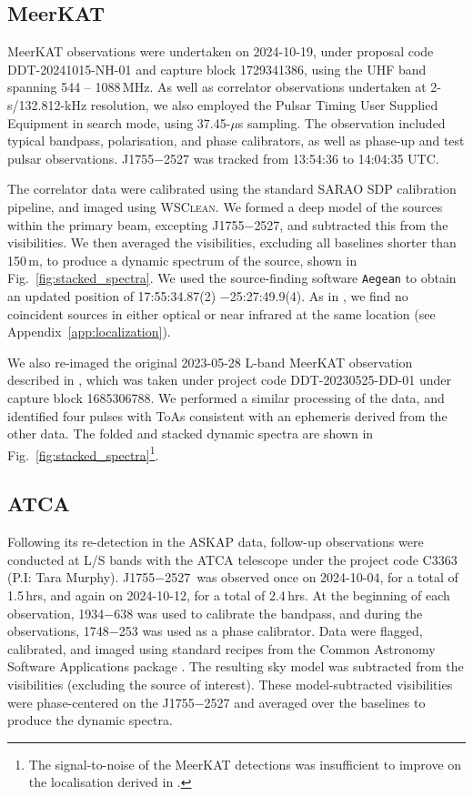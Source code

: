 \documentclass[fleqn,usenatbib]{mnras}
\newcommand{\revision}[2]{{\color{red}#2}}
\newcommand{\src}{J1755$-$2527}
\newcommand{\Fig}{Fig.}
\begin{document}
\subsection{MeerKAT} \label{sec:meerkat}

MeerKAT observations were undertaken on 2024-10-19, under proposal code DDT-20241015-NH-01 and capture block 1729341386, using the UHF band spanning 544 -- 1088\,MHz.
As well as correlator observations undertaken at 2-s/132.812-kHz resolution, we also employed the Pulsar Timing User Supplied Equipment \citep[PTUSE;][]{2020PASA...37...28B} in search mode, using 37.45-$\mu$s sampling. The observation included typical bandpass, polarisation, and phase calibrators, as well as phase-up and test pulsar observations. \src{} was tracked from 13:54:36 to 14:04:35 UTC.

The correlator data were calibrated using the standard SARAO SDP calibration pipeline, and imaged using \textsc{WSClean}. We formed a deep model of the sources within the primary beam, excepting \src{}, and subtracted this from the visibilities.
We then averaged the visibilities, excluding all baselines shorter than 150\,m, to produce a dynamic spectrum of the source, shown in \Fig~\ref{fig:stacked_spectra}.
\revision{}{We used the source-finding software \texttt{Aegean} \citep{2018PASA...35...11H} to obtain an updated position of 17:55:34.87(2) $-$25:27:49.9(4).
As in \citetalias{2024MNRAS.535..909D}, we find no coincident sources in either optical or near infrared at the same location (see Appendix~\ref{app:localization}).}

We also re-imaged the original 2023-05-28 L-band MeerKAT observation described in , which was taken under project code DDT-20230525-DD-01 under capture block 1685306788. We performed a similar processing of the data, and identified four pulses with ToAs consistent with an ephemeris derived from the other data. The folded and stacked dynamic spectra are shown in \Fig~\ref{fig:stacked_spectra}\footnote{The signal-to-noise of the MeerKAT detections was insufficient to improve on the localisation derived in .}.

\subsection{ATCA}

Following its re-detection in the ASKAP data, follow-up observations were conducted at L/S bands with the ATCA telescope under the project code C3363 (P.I: Tara Murphy). \src\ was observed once on 2024-10-04, for a total of 1.5\,hrs, and again on 2024-10-12, for a total of 2.4\,hrs. At the beginning of each observation, 1934$-$638 was used to calibrate the bandpass, and during the observations, 1748$-$253 was used as a phase calibrator. Data were flagged, calibrated, and imaged using standard recipes from the Common Astronomy Software Applications package \citep[CASA;][]{casa}. The resulting sky model was subtracted from the visibilities (excluding the source of interest). These model-subtracted visibilities were phase-centered on the \src{} and averaged over the baselines to produce the dynamic spectra. 
\end{document}
